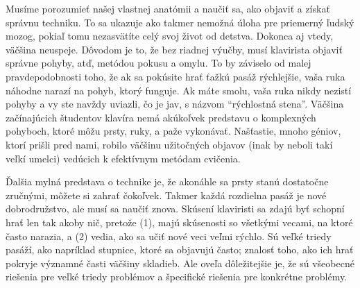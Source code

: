 Musíme porozumieť našej vlastnej anatómii a naučiť sa, ako objaviť a získať správnu techniku. To sa ukazuje ako takmer nemožná úloha pre priemerný ľudský mozog, pokiaľ tomu nezasvätíte celý svoj život od detstva. Dokonca aj vtedy, väčšina neuspeje. Dôvodom je to, že bez riadnej výučby, musí klavirista objaviť správne pohyby, atď, metódou pokusu a omylu. To by záviselo od malej pravdepodobnosti toho, že ak sa pokúsite hrať ťažkú pasáž rýchlejšie, vaša ruka náhodne narazí na pohyb, ktorý funguje. Ak máte smolu, vaša ruka nikdy nezistí pohyby a vy ste navždy uviazli, čo je jav, s názvom “rýchlostná stena”. Väčšina začínajúcich študentov klavíra nemá akúkoľvek predstavu o komplexných pohyboch, ktoré môžu prsty, ruky, a paže vykonávať. Našťastie, mnoho géniov, ktorí prišli pred nami, robilo väčšinu užitočných objavov (inak by neboli takí veľkí umelci) vedúcich k efektívnym metódam cvičenia.

Ďalšia mylná predstava o technike je, že akonáhle sa prsty stanú dostatočne zručnými, môžete si zahrať čokoľvek. Takmer každá rozdielna pasáž je nové dobrodružstvo, ale musí sa naučiť znova. Skúsení klaviristi sa zdajú byť schopní hrať len tak akoby nič, pretože (1), majú skúsenosti so všetkými vecami, na ktoré často narazia, a (2) vedia, ako sa učiť nové veci veľmi rýchlo. Sú veľké triedy pasáží, ako napríklad stupnice, ktoré sa objavujú často; znalosť toho, ako ich hrať pokryje významné časti väčšiny skladieb. Ale oveľa dôležitejšie je, že sú všeobecné riešenia pre veľké triedy problémov a špecifické riešenia pre konkrétne problémy.

